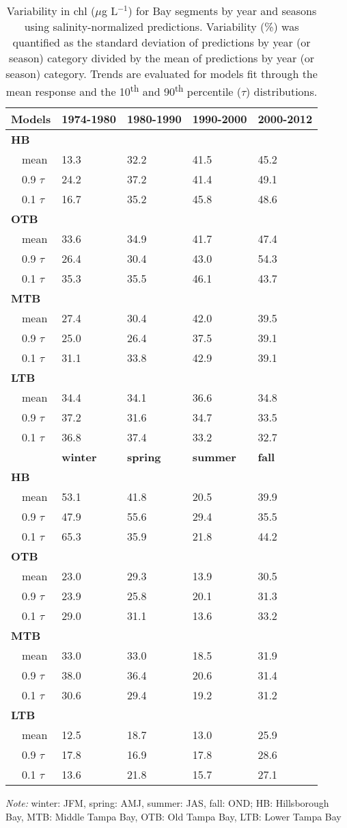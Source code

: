 \documentclass[letterpaper,12pt,oneside]{article}\usepackage[]{graphicx}\usepackage[]{color}
\newcommand{\mugl}{$\mu$g L$^{-1}$}
\begin{document}
%
\begin{table}[!tbp]
\caption{Variability in \ac{chl} (\mugl) for Bay segments by year and seasons using salinity-normalized predictions.  Variability (\%) was quantified as the standard deviation of predictions by year (or season) category divided by the mean of predictions by year (or season) category.  Trends are evaluated for models fit through the mean response and the 10\textsuperscript{th} and 90\textsuperscript{th} percentile ($\tau$) distributions.\label{tab:nrmcv}} 
\begin{center}
\begin{tabular}{lllll}
\hline\hline
\multicolumn{1}{l}{{\bf Models}}&\multicolumn{1}{c}{{\bf 1974-1980}}&\multicolumn{1}{c}{{\bf 1980-1990}}&\multicolumn{1}{c}{{\bf 1990-2000}}&\multicolumn{1}{c}{{\bf 2000-2012}}\tabularnewline
\hline
{\bfseries HB}&&&&\tabularnewline
~~mean&13.3&32.2&41.5&45.2\tabularnewline
~~0.9 $\tau$&24.2&37.2&41.4&49.1\tabularnewline
~~0.1 $\tau$&16.7&35.2&45.8&48.6\tabularnewline
\hline
{\bfseries OTB}&&&&\tabularnewline
~~mean&33.6&34.9&41.7&47.4\tabularnewline
~~0.9 $\tau$&26.4&30.4&43.0&54.3\tabularnewline
~~0.1 $\tau$&35.3&35.5&46.1&43.7\tabularnewline
\hline
{\bfseries MTB}&&&&\tabularnewline
~~mean&27.4&30.4&42.0&39.5\tabularnewline
~~0.9 $\tau$&25.0&26.4&37.5&39.1\tabularnewline
~~0.1 $\tau$&31.1&33.8&42.9&39.1\tabularnewline
\hline
{\bfseries LTB}&&&&\tabularnewline
~~mean&34.4&34.1&36.6&34.8\tabularnewline
~~0.9 $\tau$&37.2&31.6&34.7&33.5\tabularnewline
~~0.1 $\tau$&36.8&37.4&33.2&32.7\tabularnewline
\hline
~~&{\bf winter}&{\bf spring}&{\bf summer}&{\bf fall}\tabularnewline
\hline
{\bfseries HB}&&&&\tabularnewline
~~mean&53.1&41.8&20.5&39.9\tabularnewline
~~0.9 $\tau$&47.9&55.6&29.4&35.5\tabularnewline
~~0.1 $\tau$&65.3&35.9&21.8&44.2\tabularnewline
\hline
{\bfseries OTB}&&&&\tabularnewline
~~mean&23.0&29.3&13.9&30.5\tabularnewline
~~0.9 $\tau$&23.9&25.8&20.1&31.3\tabularnewline
~~0.1 $\tau$&29.0&31.1&13.6&33.2\tabularnewline
\hline
{\bfseries MTB}&&&&\tabularnewline
~~mean&33.0&33.0&18.5&31.9\tabularnewline
~~0.9 $\tau$&38.0&36.4&20.6&31.4\tabularnewline
~~0.1 $\tau$&30.6&29.4&19.2&31.2\tabularnewline
\hline
{\bfseries LTB}&&&&\tabularnewline
~~mean&12.5&18.7&13.0&25.9\tabularnewline
~~0.9 $\tau$&17.8&16.9&17.8&28.6\tabularnewline
~~0.1 $\tau$&13.6&21.8&15.7&27.1\tabularnewline
\hline
\end{tabular}
\end{center}
\footnotesize \textit{Note:} winter: JFM, spring: AMJ, summer: JAS, fall: OND; HB: Hillsborough Bay, MTB: Middle Tampa Bay, OTB: Old Tampa Bay, LTB: Lower Tampa Bay\end{table}
\end{document}
